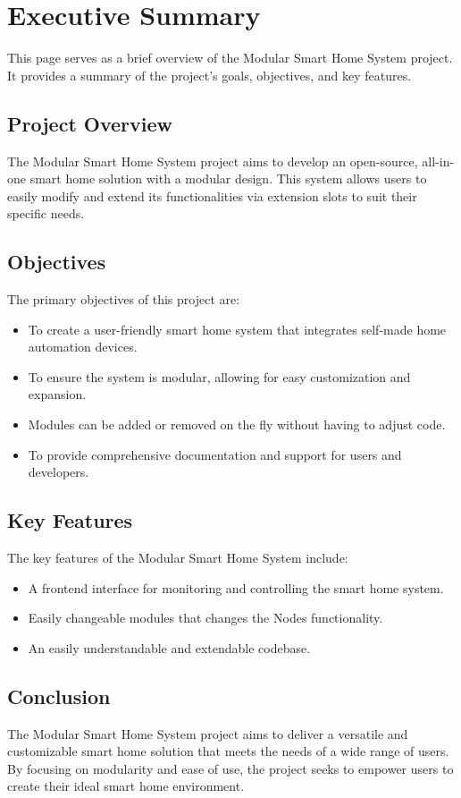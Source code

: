 \chapter{Executive Summary}
This page serves as a brief overview of the Modular Smart Home System project.
It provides a summary of the project's goals, objectives, and key features.

\section{Project Overview}
The Modular Smart Home System project aims to develop an open-source, 
all-in-one smart home solution with a modular design. This system 
allows users to easily modify and extend its functionalities via 
extension slots to suit their specific needs.

\section{Objectives}
The primary objectives of this project are:
\begin{itemize}
    \item To create a user-friendly smart home system that integrates self-made home automation devices.
    \item To ensure the system is modular, allowing for easy customization and expansion. 
    \item Modules can be added or removed  on the fly without having to adjust code.
    \item To provide comprehensive documentation and support for users and developers.
\end{itemize}

\section{Key Features}
The key features of the Modular Smart Home System include:
\begin{itemize}
    \item A frontend interface for monitoring and controlling the smart home system.
    \item Easily changeable modules that changes the Nodes functionality.
    \item An easily understandable and extendable codebase.
\end{itemize}

\section{Conclusion}
The Modular Smart Home System project aims to deliver a versatile 
and customizable smart home solution that meets the needs of a wide 
range of users. By focusing on modularity and ease of use, the project 
seeks to empower users to create their ideal smart home environment.